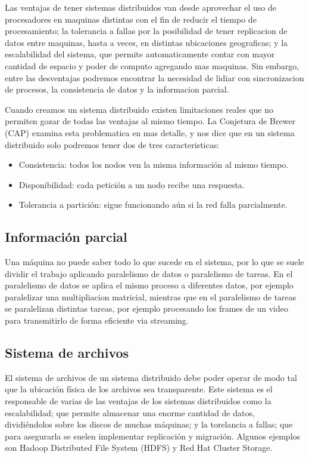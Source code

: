 \documentclass{article}
\begin{document}
Las ventajas de tener sistemas distribuidos van desde aprovechar el uso de procesadores en maquinas distintas con el fin de reducir el tiempo de procesamiento; la tolerancia a fallas por la posibilidad de tener replicacion de datos entre maquinas, hasta a veces, en distintas ubicaciones geograficas; y la escalabilidad del sistema, que permite automaticamente contar con mayor cantidad de espacio y poder de computo agregando mas maquinas. Sin embargo, entre las desventajas podremos encontrar la necesidad de lidiar con sincronizacion de procesos, la consistencia de datos y la informacion parcial.

Cuando creamos un sistema distribuido existen limitaciones reales que no permiten gozar de todas las ventajas al mismo tiempo. La Conjetura de Brewer (CAP) examina esta problematica en mas detalle, y nos dice que en un sistema distribuido solo podremos tener dos de tres caracteristicas:
\begin{itemize}
\item Consistencia: todos los nodos ven la misma información al mismo tiempo.
\item Disponibilidad: cada petición a un nodo recibe una respuesta.
\item Tolerancia a partición: sigue funcionando aún si la red falla parcialmente.
\end{itemize}

\subsection{Información parcial}
Una máquina no puede saber todo lo que sucede en el sistema, por lo que se suele dividir el trabajo aplicando paralelismo de datos o paralelismo de tareas. En el paralelismo de datos se aplica el mismo proceso a diferentes datos, por ejemplo paralelizar una multipliacion matricial, mientras que en el paralelismo de tareas se paralelizan distintas tareas, por ejemplo procesando los frames de un video para transmitirlo de forma eficiente via streaming.

\subsection{Sistema de archivos}

El sistema de archivos de un sistema distribuido debe poder operar de modo tal que la ubicación física de los archivos sea transparente. Este sistema es el responsable de varias de las ventajas de los sistemas distribuidos como la escalabilidad; que permite almacenar una enorme cantidad de datos, dividiéndolos sobre los discos de muchas máquinas; y la torelancia a fallas; que para asegurarla se suelen implementar replicación y migración. Algunos ejemplos son Hadoop Distributed File System (HDFS) y Red Hat Cluster Storage.
\end{document}
